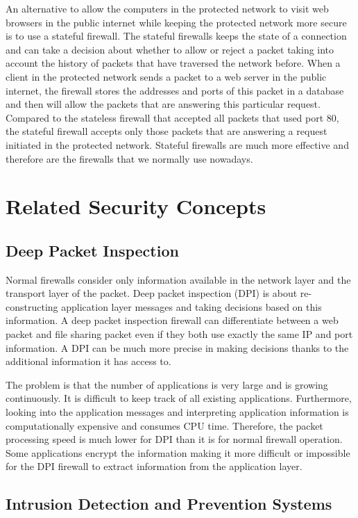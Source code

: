 An alternative to allow the computers in the protected network to visit web browsers in the public internet while keeping the protected network more secure is to use a stateful firewall.
The stateful firewalls keeps the state of a connection and can take a decision about whether to allow or reject a packet taking into account the history of packets that have traversed the network before.
When a client in the protected network sends a packet to a web server in the public internet, the firewall stores the addresses and ports of this packet in a database and then will allow the packets that are answering this particular request.
Compared to the stateless firewall that accepted all packets that used port 80, the stateful firewall accepts only those packets that are answering a request initiated in the protected network.
Stateful firewalls are much more effective and therefore are the firewalls that we normally use nowadays.

\section{Related Security Concepts}

\subsection{Deep Packet Inspection}

Normal firewalls consider only information available in the network layer and the transport layer of the packet.
Deep packet inspection (DPI) is about re-constructing application layer messages and taking decisions based on this information.
A deep packet inspection firewall can differentiate between a web packet and file sharing packet even if they both use exactly the same IP and port information.
A DPI can be much more precise in making decisions thanks to the additional information it has access to.

The problem is that the number of applications is very large and is growing continuously.
It is difficult to keep track of all existing applications. 
Furthermore, looking into the application messages and interpreting application information is computationally expensive and consumes CPU time.
Therefore, the packet processing speed is much lower for DPI than it is for normal firewall operation.
Some applications encrypt the information making it more difficult or impossible for the DPI firewall to extract information from the application layer.

\subsection{Intrusion Detection and Prevention Systems}

